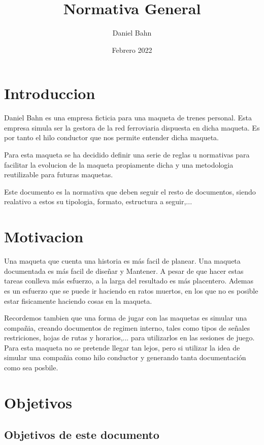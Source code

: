 \documentclass{DccDiyTools/DccDiyTools}
\title{Normativa General}
\author{Daniel Bahn}
\date{Febrero 2022}
\begin{document}
\maketitle


\section{Introduccion}
Daniel Bahn es una empresa ficticia para una maqueta de trenes personal. Esta empresa simula ser la gestora de la red ferroviaria dispuesta en dicha maqueta.
Es por tanto el hilo conductor que nos permite entender dicha maqueta.

Para esta maqueta se ha decidido definir una serie de reglas u normativas para facilitar la evolucion de la maqueta propiamente dicha y una metodologia
reutilizable para futuras maquetas.

Este documento es la normativa que deben seguir el resto de documentos, siendo realativo a estos su tipologia, formato, estructura a seguir,...

\section{Motivacion}
Una maqueta que cuenta una historia es más facil de planear. Una maqueta documentada es más facil de diseñar y Mantener. A pesar de que hacer estas
tareas conlleva más esfuerzo, a la larga del resultado es más placentero. Ademas es un esfuerzo que se puede ir haciendo en ratos muertos, en los que 
no es posible estar fisicamente haciendo cosas en la maqueta.

Recordemos tambien que una forma de jugar con las maquetas es simular una compañia, creando documentos de regimen interno, tales como tipos de señales
restriciones, hojas de rutas y horarios,... para utilizarlos en las sesiones de juego. Para esta maqueta no se pretende llegar tan lejos, pero si
utilizar la idea de simular una compañia como hilo conductor y generando tanta documentación como sea posbile.

\section{Objetivos}
\subsection{Objetivos de este documento}

\end{document}
